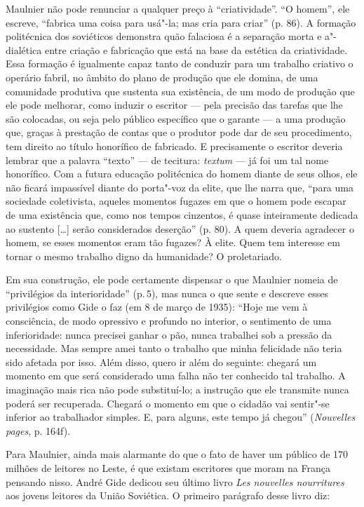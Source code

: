 Maulnier não pode renunciar a qualquer preço à ``criatividade''. ``O
homem'', ele escreve, ``fabrica uma coisa para usá"-la; mas cria para
criar'' (p. 86). A formação politécnica dos soviéticos demonstra quão falaciosa é a separação morta e a"-dialética entre
criação e fabricação que está na base da estética da criatividade.
Essa formação é
igualmente capaz tanto de conduzir para um trabalho criativo o operário
fabril, no âmbito do plano de produção que ele domina, de uma comunidade
produtiva que sustenta sua existência, de um modo de produção que ele
pode melhorar, como induzir o escritor --- pela precisão das tarefas que
lhe são colocadas, ou seja pelo público específico que o garante --- a
uma produção que, graças à prestação de contas que o produtor pode dar
de seu procedimento, tem direito ao título honorífico de fabricado. E
precisamente o escritor deveria lembrar que a palavra ``texto'' --- de
tecitura: \emph{textum} --- já foi um tal nome honorífico. Com a futura
educação politécnica do homem diante de seus olhos, ele não ficará
impassível diante do porta"-voz da elite, que lhe narra que, ``para uma
sociedade coletivista, aqueles momentos fugazes em que o homem pode
escapar de uma existência que, como nos tempos cinzentos, é quase
inteiramente dedicada ao sustento {[}\ldots{}{]} serão considerados deserção''
(p. 80). A quem deveria agradecer o homem, se esses momentos eram tão
fugazes? À elite. Quem tem interesse em tornar o mesmo trabalho digno da
humanidade? O proletariado.

Em sua construção, ele pode certamente dispensar o que
Maulnier nomeia de ``privilégios da interioridade'' (p.\,5), mas nunca
o que sente e descreve esses privilégios como Gide o faz (em 8 de
março de 1935): ``Hoje me vem à consciência, de modo opressivo e
profundo no interior, o sentimento de uma inferioridade: nunca precisei
ganhar o pão, nunca trabalhei sob a pressão da necessidade. Mas sempre
amei tanto o trabalho que minha felicidade não teria sido afetada por
isso. Além disso, quero ir além do seguinte: chegará um momento em que
será considerado uma falha não ter conhecido tal trabalho. A imaginação
mais rica não pode substituí-lo; a instrução que ele transmite nunca
poderá ser recuperada. Chegará o momento em que o cidadão vai sentir"-se
inferior ao trabalhador simples. E, para alguns, este tempo já chegou''
(\emph{Nouvelles pages}, p. 164f).

Para Maulnier, ainda mais alarmante do que o fato de haver um público de
170 milhões de leitores no Leste, é que existam escritores que moram na
França pensando nisso. André Gide dedicou seu último livro \emph{Les
nouvelles nourritures} aos jovens leitores da União Soviética. O
primeiro parágrafo desse livro diz:

